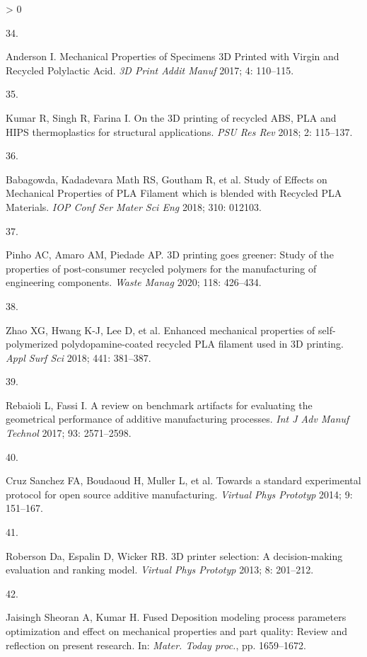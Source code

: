 \documentclass[
  12pt]{article}
\newlength{\cslhangindent}
\newlength{\csllabelwidth}
\newenvironment{CSLReferences}[2] %
 {%
  \setlength{\parindent}{0pt}
  \ifodd #1 \everypar{\setlength{\hangindent}{\cslhangindent}}\ignorespaces\fi
  \ifnum #2 > 0
  \setlength{\parskip}{#2\baselineskip}
  \fi
 }%
 {}
\newcommand{\CSLLeftMargin}[1]{\parbox[t]{\csllabelwidth}{#1}}
\newcommand{\CSLRightInline}[1]{\parbox[t]{\linewidth - \csllabelwidth}{#1}\break}
\begin{document}
\begin{CSLReferences}{0}{0}
\leavevmode\hypertarget{ref-Anderson2017}{}%
\CSLLeftMargin{34. }
\CSLRightInline{Anderson I. {Mechanical Properties of Specimens 3D Printed with Virgin and Recycled Polylactic Acid}. \emph{3D Print Addit Manuf} 2017; 4: 110--115.}

\leavevmode\hypertarget{ref-Kumar2018b}{}%
\CSLLeftMargin{35. }
\CSLRightInline{Kumar R, Singh R, Farina I. {On the 3D printing of recycled ABS, PLA and HIPS thermoplastics for structural applications}. \emph{PSU Res Rev} 2018; 2: 115--137.}

\leavevmode\hypertarget{ref-Babagowda2018}{}%
\CSLLeftMargin{36. }
\CSLRightInline{Babagowda, Kadadevara Math RS, Goutham R, et al. {Study of Effects on Mechanical Properties of PLA Filament which is blended with Recycled PLA Materials}. \emph{IOP Conf Ser Mater Sci Eng} 2018; 310: 012103.}

\leavevmode\hypertarget{ref-Pinho2020}{}%
\CSLLeftMargin{37. }
\CSLRightInline{Pinho AC, Amaro AM, Piedade AP. {3D printing goes greener: Study of the properties of post-consumer recycled polymers for the manufacturing of engineering components}. \emph{Waste Manag} 2020; 118: 426--434.}

\leavevmode\hypertarget{ref-Zhao2018a}{}%
\CSLLeftMargin{38. }
\CSLRightInline{Zhao XG, Hwang K-J, Lee D, et al. {Enhanced mechanical properties of self-polymerized polydopamine-coated recycled PLA filament used in 3D printing}. \emph{Appl Surf Sci} 2018; 441: 381--387.}

\leavevmode\hypertarget{ref-Rebaioli2017}{}%
\CSLLeftMargin{39. }
\CSLRightInline{Rebaioli L, Fassi I. {A review on benchmark artifacts for evaluating the geometrical performance of additive manufacturing processes}. \emph{Int J Adv Manuf Technol} 2017; 93: 2571--2598.}

\leavevmode\hypertarget{ref-CruzSanchez2014}{}%
\CSLLeftMargin{40. }
\CSLRightInline{Cruz Sanchez FA, Boudaoud H, Muller L, et al. {Towards a standard experimental protocol for open source additive manufacturing}. \emph{Virtual Phys Prototyp} 2014; 9: 151--167.}

\leavevmode\hypertarget{ref-Roberson2013}{}%
\CSLLeftMargin{41. }
\CSLRightInline{Roberson Da, Espalin D, Wicker RB. {3D printer selection: A decision-making evaluation and ranking model}. \emph{Virtual Phys Prototyp} 2013; 8: 201--212.}

\leavevmode\hypertarget{ref-JaisinghSheoran2019}{}%
\CSLLeftMargin{42. }
\CSLRightInline{Jaisingh Sheoran A, Kumar H. {Fused Deposition modeling process parameters optimization and effect on mechanical properties and part quality: Review and reflection on present research}. In: \emph{Mater. Today proc.}, pp. 1659--1672.}


\end{CSLReferences}
\end{document}
